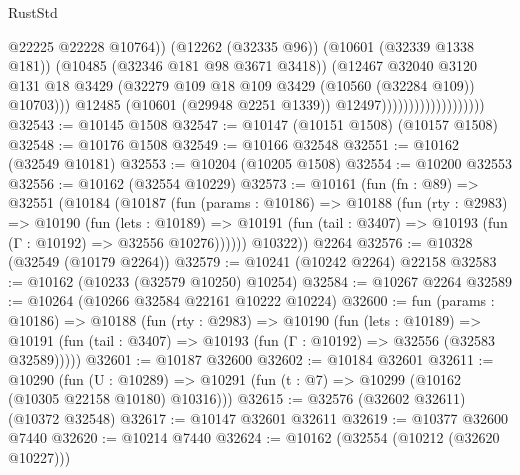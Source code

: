 \begin{lexlean}{RustStd}
\begin{coremodule}
                                                @22225
                                                @22228
                                                @10764))
                                            (@12262 (@32335 @96))
                                            (@10601 (@32339 @1338 @181))
                                            (@10485 (@32346 @181 @98 @3671 @3418))
                                            (@12467
                                              @32040
                                              @3120
                                              @131
                                              @18
                                              @3429
                                              (@32279
                                                @109
                                                @18
                                                @109
                                                @3429
                                                (@10560 (@32284 @109))
                                                @10703)))
                                          @12485
                                          (@10601 (@29948 @2251 @1339))
                                          @12497)))))))))))))))))))
@32543 := @10145 @1508
@32547 := @10147 (@10151 @1508) (@10157 @1508)
@32548 := @10176 @1508
@32549 := @10166 @32548
@32551 := @10162 (@32549 @10181)
@32553 := @10204 (@10205 @1508)
@32554 := @10200 @32553
@32556 := @10162 (@32554 @10229)
@32573 := @10161
    (fun (fn : @89) =>
    @32551
      (@10184
        (@10187
          (fun (params : @10186) =>
          @10188
            (fun (rty : @2983) =>
            @10190
              (fun (lets : @10189) =>
              @10191 (fun (tail : @3407) => @10193 (fun (Γ : @10192) => @32556 @10276))))))
        @10322))
    @2264
@32576 := @10328 (@32549 (@10179 @2264))
@32579 := @10241 (@10242 @2264) @22158
@32583 := @10162 (@10233 (@32579 @10250) @10254)
@32584 := @10267 @2264
@32589 := @10264 (@10266 @32584 @22161 @10222 @10224)
@32600 := fun (params : @10186) =>
  @10188
    (fun (rty : @2983) =>
    @10190
      (fun (lets : @10189) =>
      @10191 (fun (tail : @3407) => @10193 (fun (Γ : @10192) => @32556 (@32583 @32589)))))
@32601 := @10187 @32600
@32602 := @10184 @32601
@32611 := @10290
    (fun (U : @10289) => @10291 (fun (t : @7) => @10299 (@10162 (@10305 @22158 @10180) @10316)))
@32615 := @32576 (@32602 @32611) (@10372 @32548)
@32617 := @10147 @32601 @32611
@32619 := @10377 @32600 @7440
@32620 := @10214 @7440
@32624 := @10162 (@32554 (@10212 (@32620 @10227)))

\end{coremodule}
\end{lexlean}
